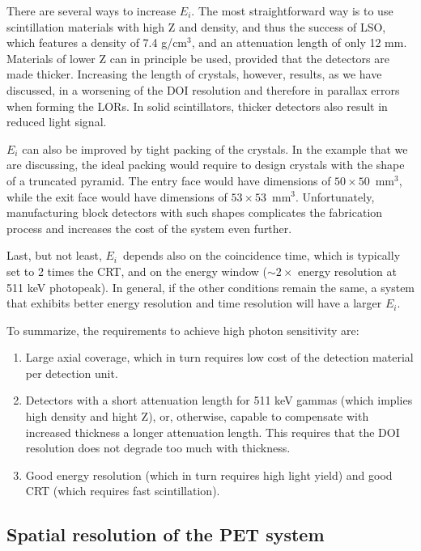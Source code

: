 \documentclass[review]{elsarticle}
\begin{document}
There are several ways to increase $E_i$.
The most straightforward way is to use scintillation
materials with high Z and density, and thus the success of LSO, which features a density of 7.4 g/cm$^3$, and an attenuation length of only 12 mm. Materials of lower Z can in principle be used, provided that the detectors are made thicker. Increasing the length of crystals, however, results, as we have discussed, in a worsening of the DOI resolution and therefore in parallax errors when forming the LORs. In solid scintillators, thicker detectors also result in reduced light signal. 

$E_i$ can also be improved by tight packing of the crystals. In the example that we are discussing, the ideal packing would require to design crystals with the shape of a truncated pyramid. The entry face would have dimensions of $50 \times 50$~mm$^3$, while the exit face would have dimensions of $53 \times 53$~mm$^3$. Unfortunately, manufacturing block detectors with such shapes complicates the fabrication process and increases the cost of the system even further. 

Last, but not least, $E_i$~depends also on the coincidence time, which is typically set to 2 times the CRT, and on the energy window ($\sim 2\times$ energy resolution at 511 keV photopeak). In general, if the
other conditions remain the same, a system that exhibits better energy resolution and time
resolution will have a larger $E_i$.

To summarize, the requirements to achieve high photon sensitivity are:
\begin{enumerate}
\item Large axial coverage, which in turn requires low cost of the detection material per detection unit. 
\item Detectors with a short attenuation length for 511 keV gammas (which implies high density and hight Z), or, otherwise, capable to compensate with increased thickness a longer attenuation length. This requires that the DOI resolution does not degrade too much with thickness. 
\item Good energy resolution (which in turn requires high light yield) and good CRT (which requires fast scintillation).
\end{enumerate}

\subsection*{Spatial resolution of the PET system}
\end{document}
